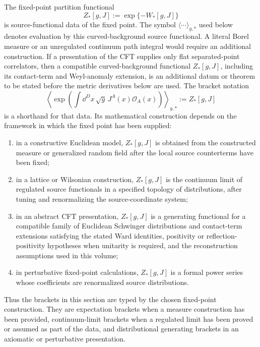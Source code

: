 \begin{definition}
\label{def:cft-fixed-point-source-bracket-status}
The fixed-point partition functional
\[
  Z_\ast[g,J]:=\exp\{-W_\ast[g,J]\}
\]
is source-functional data of the fixed point.  The symbol
\(\langle\cdots\rangle_{g,\ast}\) used below denotes evaluation by this
curved-background source functional.  A literal Borel measure or an
unregulated continuum path integral would require an additional construction.
If a presentation of the CFT supplies only flat separated-point correlators,
then a compatible curved-background functional
\(Z_\ast[g,J]\), including its contact-term and Weyl-anomaly extension, is an
additional datum or theorem to be stated before the metric derivatives below
are used.  The bracket notation
\[
  \left\langle
  \exp\left(\int\dd^Dx\,\sqrt g\,J^A(x)\mathcal O_A(x)\right)
  \right\rangle_{g,\ast}
  :=
  Z_\ast[g,J]
\]
is a shorthand for that data.  Its mathematical construction depends on the
framework in which the fixed point has been supplied:
\begin{enumerate}[label=(\roman*)]
  \item in a constructive Euclidean model, \(Z_\ast[g,J]\) is obtained from
  the constructed measure or generalized random field after the local
  source counterterms have been fixed;
  \item in a lattice or Wilsonian construction, \(Z_\ast[g,J]\) is the
  continuum limit of regulated source functionals in a specified topology of
  distributions, after tuning and renormalizing the source-coordinate system;
  \item in an abstract CFT presentation, \(Z_\ast[g,J]\) is a generating
  functional for a compatible family of Euclidean Schwinger distributions and
  contact-term extensions satisfying the stated Ward identities, positivity
  or reflection-positivity hypotheses when unitarity is required, and the
  reconstruction assumptions used in this volume;
  \item in perturbative fixed-point calculations, \(Z_\ast[g,J]\) is a formal
  power series whose coefficients are renormalized source distributions.
\end{enumerate}
Thus the brackets in this section are typed by the chosen fixed-point
construction.  They are expectation brackets when a measure construction has
been provided, continuum-limit brackets when a regulated limit has been
proved or assumed as part of the data, and distributional generating
brackets in an axiomatic or perturbative presentation.
\end{definition}

